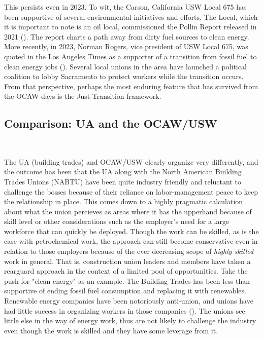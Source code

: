 \documentclass[12pt]{article}
\begin{document}
This persists even in 2023. To wit, the Carson, California USW Local 675 has been supportive of several environmental initiatives and efforts. The Local, which it is important to note is an oil local, commissioned the Pollin Report released in 2021 (\cite{pollinProgramEconomicRecovery2021}). The report charts a path away from dirty fuel sources to clean energy. More recently, in 2023, Norman Rogers, vice president of USW Local 675, was quoted in the Los Angeles Times as a supporter of a transition from fossil fuel to clean energy jobs (\cite{rothCanClimateActivists2023}). Several local unions in the area have launched a political coalition to lobby Sacramento to protect workers while the transition occurs. From that perspective, perhaps the most enduring feature that has survived from the OCAW days is the Just Transition framework.

\subsection{Comparison: UA and the OCAW/USW}\

The UA (building trades) and OCAW/USW clearly organize very differently, and the outcome has been that the UA along with the North American Building Trades Unions (NABTU) have been quite industry friendly and reluctant to challenge the bosses because of their reliance on labor-management peace to keep the relationship in place. This comes down to a highly pragmatic calculation about what the union percieves as areas where it has the upperhand because of skill level or other considerations such as the employer's need for a large workforce that can quickly be deployed. Though the work can be skilled, as is the case with petrochemical work, the approach can still become conservative even in relation to those employers because of the ever decreasing scope of \emph{highly skilled} work in general. That is, construction union leaders and members have taken a rearguard approach in the context of a limited pool of opportunities. Take the push for "clean energy" as an example. The Building Trades has been less than supportive of ending fossil fuel consumption and replacing it with renewables. Renewable energy companies have been notoriously anti-union, and unions have had little success in organizing workers in those companies (\cite{scheiberBuildingSolarFarms2021}). The unions see little else in the way of energy work, thus are not likely to challenge the industry even though the work is skilled and they have some leverage from it.
\end{document}

